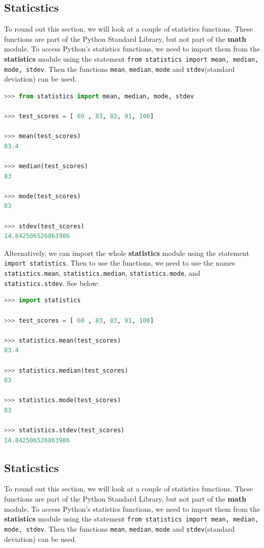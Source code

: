 \documentclass{book}
\begin{document}
    \subsection{Staticstics}\label{staticstics}

To round out this section, we will look at a couple of statistics
functions. These functions are part of the Python Standard Library, but
not part of the \textbf{math} module. To access Python's statistics
functions, we need to import them from the \textbf{statistics} module
using the statement
\lstinline!from statistics import mean, median, mode, stdev!. Then the
functions \lstinline!mean!, \lstinline!median!, \lstinline!mode! and
\lstinline!stdev!(standard deviation) can be used.

\begin{lstlisting}[language=Python]
>>> from statistics import mean, median, mode, stdev
    
>>> test_scores = [ 60 , 83, 83, 91, 100]
    
>>> mean(test_scores)
83.4

>>> median(test_scores)
83

>>> mode(test_scores)
83
    
>>> stdev(test_scores)
14.842506526863986 
\end{lstlisting}

Alternatively, we can import the whole \textbf{statistics} module using
the statement \lstinline!import statistics!. Then to use the functions,
we need to use the names \lstinline!statistics.mean!,
\lstinline!statistics.median!, \lstinline!statistics.mode!, and
\lstinline!statistics.stdev!. See below:

\begin{lstlisting}[language=Python]
>>> import statistics
    
>>> test_scores = [ 60 , 83, 83, 91, 100]
    
>>> statistics.mean(test_scores)
83.4

>>> statistics.median(test_scores)
83

>>> statistics.mode(test_scores)
83
    
>>> statistics.stdev(test_scores)
14.842506526863986 
\end{lstlisting}

    \subsection{Staticstics}\label{staticstics}

To round out this section, we will look at a couple of statistics
functions. These functions are part of the Python Standard Library, but
not part of the \textbf{math} module. To access Python's statistics
functions, we need to import them from the \textbf{statistics} module
using the statement
\lstinline!from statistics import mean, median, mode, stdev!. Then the
functions \lstinline!mean!, \lstinline!median!, \lstinline!mode! and
\lstinline!stdev!(standard deviation) can be used.
\end{document}
